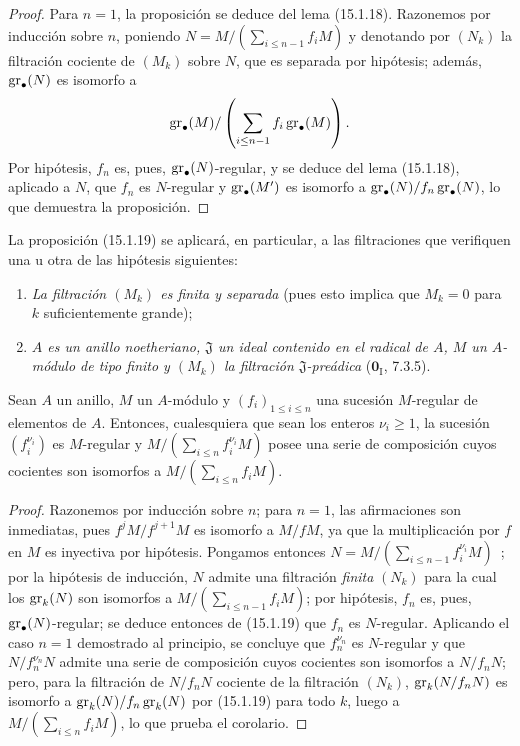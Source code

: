 \begin{proof}
Para $n=1$, la proposición se deduce del lema (15.1.18). Razonemos por
inducción sobre $n$, poniendo
$N=M/(\sum_{i\leq n-1}f_iM)$
y denotando por $(N_k)$ la filtración cociente de $(M_k)$ sobre $N$, que es
separada por hipótesis; además, $\operatorname{gr}_\bullet(N)$ es isomorfo a
\[
  \operatorname{gr}_\bullet(M)/
  \left(\sum_{i\leq n-1}f_i\operatorname{gr}_\bullet(M)\right).
\]
Por hipótesis, $f_n$ es, pues, $\operatorname{gr}_\bullet(N)$-regular, y se deduce del lema
(15.1.18), aplicado a $N$, que $f_n$ es $N$-regular y $\operatorname{gr}_\bullet(M')$ es
isomorfo a $\operatorname{gr}_\bullet(N)/f_n\operatorname{gr}_\bullet(N)$, lo que demuestra la
proposición.
\end{proof}

La proposición (15.1.19) se aplicará, en particular, a las filtraciones que
verifiquen una u otra de las hipótesis siguientes:
\begin{enumerate}
  \item[$1^\circ$] \emph{La filtración $(M_k)$ es finita y separada} (pues esto
  implica que $M_k=0$ para $k$ suficientemente grande);
  \item[$2^\circ$] \emph{$A$ es un anillo noetheriano, $\mathfrak{J}$ un ideal
  contenido en el radical de $A$, $M$ un $A$-módulo de tipo finito y $(M_k)$
  la filtración $\mathfrak{J}$-preádica} ($\mathbf{0}_{\mathrm I}$, 7.3.5).
\end{enumerate}


\begin{corollary}[15.1.20]
\label{0.15.1.20-fr}

Sean $A$ un anillo, $M$ un $A$-módulo y $(f_i)_{1\leq i\leq n}$ una sucesión
$M$-regular de elementos de $A$. Entonces, cualesquiera que sean los enteros
$\nu_i\geq1$, la sucesión $(f_i^{\nu_i})$ es $M$-regular y
$M/(\sum_{i\leq n}f_i^{\nu_i}M)$ posee una serie de composición cuyos
cocientes son isomorfos a $M/(\sum_{i\leq n}f_iM)$.
\end{corollary}

\begin{proof}
Razonemos por inducción sobre $n$; para $n=1$, las afirmaciones son inmediatas,
pues $f^jM/f^{j+1}M$ es isomorfo a $M/fM$, ya que la multiplicación por $f$ en
$M$ es inyectiva por hipótesis. Pongamos entonces
$N=M/(\sum_{i\leq n-1}f_i^{\nu_i}M)$~;
por la hipótesis de inducción, $N$ admite una filtración \emph{finita} $(N_k)$ para la
cual los $\operatorname{gr}_k(N)$ son isomorfos a
$M/(\sum_{i\leq n-1}f_iM)$; por hipótesis, $f_n$ es, pues,
$\operatorname{gr}_\bullet(N)$-regular; se deduce entonces de (15.1.19) que $f_n$ es
$N$-regular. Aplicando el caso $n=1$ demostrado al principio, se concluye que
$f_n^{\nu_n}$ es $N$-regular y que $N/f_n^{\nu_n}N$ admite una serie de
composición cuyos cocientes son isomorfos a $N/f_nN$; pero, para la filtración
de $N/f_nN$ cociente de la filtración $(N_k)$,
$\operatorname{gr}_k(N/f_nN)$ es isomorfo a $\operatorname{gr}_k(N)/f_n\operatorname{gr}_k(N)$ por (15.1.19) para todo
$k$, luego a $M/(\sum_{i\leq n}f_iM)$, lo que prueba el corolario.
\end{proof}

